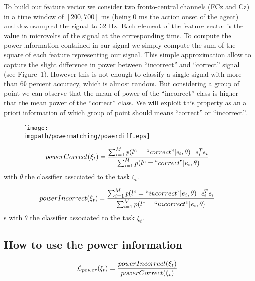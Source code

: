 To build our feature vector we consider two fronto-central channels (FCz and Cz) in a time window of $[200,700]$ ms (being 0 ms the action onset of the agent) and downsampled the signal to $32$ Hz. Each element of the feature vector is the value in microvolts of the signal at the corresponding time. To compute the power information contained in our signal we simply compute the sum of the square of each feature representing our signal. This simple approximation allow to capture the slight difference in power between ``incorrect'' and ``correct'' signal (see Figure~\ref{fig:EEGpower}). However this is not enough to classify a single signal with more than 60 percent accuracy, which is almost random. But considering a group of point we can observe that the mean of power of the ``incorrect'' class is higher that the mean power of the ``correct'' class. We will exploit this property as an a priori information of which group of point should means ``correct'' or ``incorrect''.

\begin{figure}[!ht]
\centering
\texttt{[image: \\imgpath/powermatching/powerdiff.eps]}
\caption{}
\label{fig:EEGpower}
\end{figure} 

\begin{eqnarray}
powerCorrect(\xi_t) = \frac{\sum_{i = 1}^{M} p(l^c = ``correct"| e_i , \theta) ~~ e_i^T e_i}{\sum_{i = 1}^{M} p(l^c = ``correct"| e_i , \theta)}
\label{eq:powerCorrect}
\end{eqnarray}
with $\theta$ the classifier associated to the task $\xi_t$.

\begin{eqnarray}
powerIncorrect(\xi_t) = \frac{\sum_{i = 1}^{M} p(l^c = ``incorrect"| e_i , \theta) ~~ e_i^T e_i}{\sum_{i = 1}^{M} p(l^c = ``incorrect"| e_i , \theta)}
\label{eq:powerIncorrect}
\end{eqnarray}s
with $\theta$ the classifier associated to the task $\xi_t$.


\subsection{How to use the power information}

\begin{eqnarray}
\mathcal{L}_{power}(\xi_t) = \frac{powerIncorrect(\xi_t)}{powerCorrect(\xi_t)}
\label{eq:power}
\end{eqnarray}

